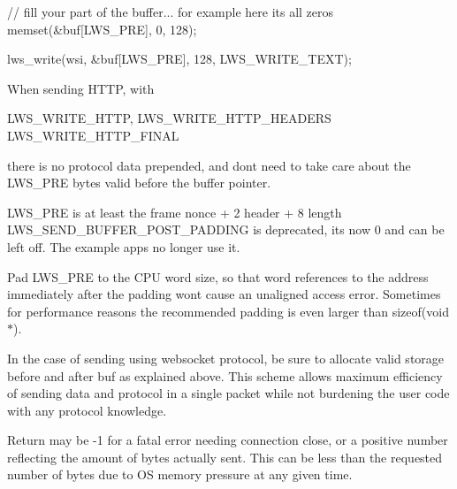 // fill your part of the buffer... for example here it\textquotesingle{}s all zeros memset(\&buf\mbox{[}\+L\+W\+S\+\_\+\+P\+R\+E\mbox{]}, 0, 128);

lws\+\_\+write(wsi, \&buf\mbox{[}\+L\+W\+S\+\_\+\+P\+R\+E\mbox{]}, 128, L\+W\+S\+\_\+\+W\+R\+I\+T\+E\+\_\+\+T\+E\+X\+T);

When sending H\+T\+TP, with

L\+W\+S\+\_\+\+W\+R\+I\+T\+E\+\_\+\+H\+T\+TP, L\+W\+S\+\_\+\+W\+R\+I\+T\+E\+\_\+\+H\+T\+T\+P\+\_\+\+H\+E\+A\+D\+E\+RS L\+W\+S\+\_\+\+W\+R\+I\+T\+E\+\_\+\+H\+T\+T\+P\+\_\+\+F\+I\+N\+AL

there is no protocol data prepended, and don\textquotesingle{}t need to take care about the L\+W\+S\+\_\+\+P\+RE bytes valid before the buffer pointer.

L\+W\+S\+\_\+\+P\+RE is at least the frame nonce + 2 header + 8 length L\+W\+S\+\_\+\+S\+E\+N\+D\+\_\+\+B\+U\+F\+F\+E\+R\+\_\+\+P\+O\+S\+T\+\_\+\+P\+A\+D\+D\+I\+NG is deprecated, it\textquotesingle{}s now 0 and can be left off. The example apps no longer use it.

Pad L\+W\+S\+\_\+\+P\+RE to the C\+PU word size, so that word references to the address immediately after the padding won\textquotesingle{}t cause an unaligned access error. Sometimes for performance reasons the recommended padding is even larger than sizeof(void $\ast$). \begin{DoxyVerb} In the case of sending using websocket protocol, be sure to allocate
 valid storage before and after buf as explained above.  This scheme
 allows maximum efficiency of sending data and protocol in a single
 packet while not burdening the user code with any protocol knowledge.

 Return may be -1 for a fatal error needing connection close, or a
 positive number reflecting the amount of bytes actually sent.  This
 can be less than the requested number of bytes due to OS memory
 pressure at any given time.\end{DoxyVerb}
 